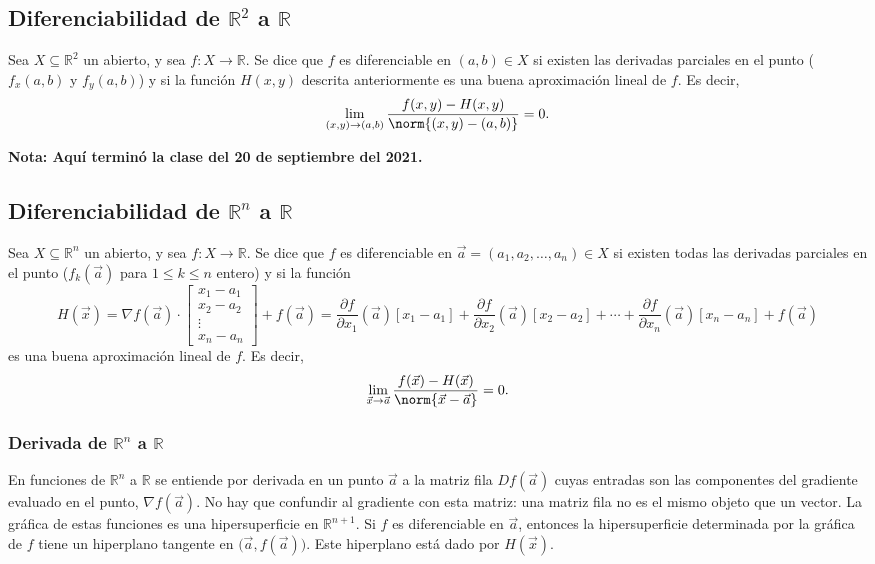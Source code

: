 \documentclass{article}
\begin{document}
\subsection*{Diferenciabilidad de $\mathbb{R}^2$ a $\mathbb{R}$}

Sea $X\subseteq\mathbb{R}^2$ un abierto, y sea $f:X\to\mathbb{R}$. Se dice que $f$ es diferenciable en $(a,b)\in X$ si existen las derivadas parciales en el punto ($f_x(a,b)$ y $f_y(a,b)$) y si la función $H(x,y)$ descrita anteriormente es una buena aproximación lineal de $f$. Es decir,
$$\lim_{(x,y)\to(a,b)}\frac{f(x,y)-H(x,y)}{\norm{(x,y)-(a,b)}}=0.$$

\vspace{10pt}
\textbf{Nota: Aquí terminó la clase del 20 de septiembre del 2021.}

\subsection*{Diferenciabilidad de $\mathbb{R}^n$ a $\mathbb{R}$}

Sea $X\subseteq\mathbb{R}^n$ un abierto, y sea $f:X\to\mathbb{R}$. Se dice que $f$ es diferenciable en $\vec{a}=(a_1,a_2,\ldots,a_n)\in X$ si existen todas las derivadas parciales en el punto ($f_k(\vec{a})$ para $1\leq k\leq n$ entero) y si la función
$$H(\vec{x})=\nabla f(\vec{a})\cdot\begin{bmatrix} x_1-a_1 \\ x_2-a_2 \\ \vdots \\ x_n-a_n \end{bmatrix}+f(\vec{a})=\frac{\partial f}{\partial x_1}(\vec{a})[x_1-a_1]+\frac{\partial f}{\partial x_2}(\vec{a})[x_2-a_2]+\cdots+\frac{\partial f}{\partial x_n}(\vec{a})[x_n-a_n]+f(\vec{a})$$
es una buena aproximación lineal de $f$. Es decir,
$$\lim_{\vec{x}\to\vec{a}}\frac{f(\vec{x})-H(\vec{x})}{\norm{\vec{x}-\vec{a}}}=0.$$

\newpage
\subsubsection*{Derivada de $\mathbb{R}^n$ a $\mathbb{R}$}

En funciones de $\mathbb{R}^n$ a $\mathbb{R}$ se entiende por derivada en un punto $\vec{a}$ a la matriz fila $Df(\vec{a})$ cuyas entradas son las componentes del gradiente evaluado en el punto, $\nabla f(\vec{a})$. No hay que confundir al gradiente con esta matriz: una matriz fila no es el mismo objeto que un vector. La gráfica de estas funciones es una hipersuperficie en $\mathbb{R}^{n+1}$. Si $f$ es diferenciable en $\vec{a}$, entonces la hipersuperficie determinada por la gráfica de $f$ tiene un hiperplano tangente en $\big(\vec{a},f(\vec{a})\big)$. Este hiperplano está dado por $H(\vec{x})$.
 
\end{document}

